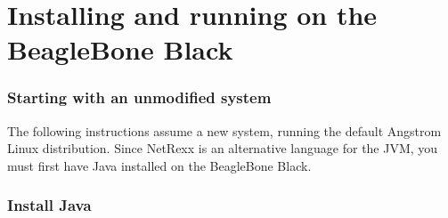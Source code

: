 \chapter{Installing and running on the BeagleBone Black}
\subsection{Starting with an unmodified system}
The following instructions assume a new system, running the default Angstrom  Linux distribution.
Since NetRexx is an alternative language for the JVM, you must first have Java installed on the BeagleBone Black.
\subsection{Install Java}
